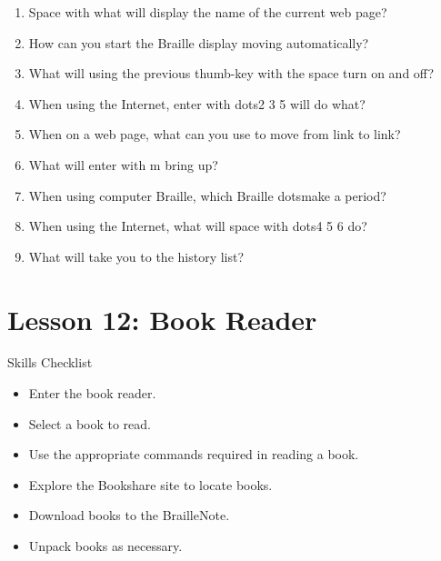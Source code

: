 \documentclass[10pt,letterpaper,twoside]{report}
\begin{document}
{{{{\begin{enumerate}
	\item Space with what will display the name of the current web page?
	      
	\item How can you start the Braille display moving automatically?
	      
	\item What will using the previous thumb-key with the space turn on and off?
	      
	\item When using the Internet, enter with dots2 3 5 will do what?
	      
	\item When on a web page, what can you use to move from link to link?
	      
	\item What will enter with m bring up?
	      
	\item When using computer Braille, which Braille dotsmake a period?
	      
	\item When using the Internet, what will space with dots4 5 6 do?
	      
	\item What will take you to the history list?
\end{enumerate}


\section*{Lesson 12: Book Reader}


Skills Checklist
\begin{itemize}


	\item Enter the book reader.
	      
	\item Select a book to read.
	      
	\item Use the appropriate commands required in reading a book.
	      
	\item Explore the Bookshare site to locate books.
	      
	\item Download books to the BrailleNote.
	      
	\item Unpack books as necessary.
\end{itemize}


}}}}
\end{document}
